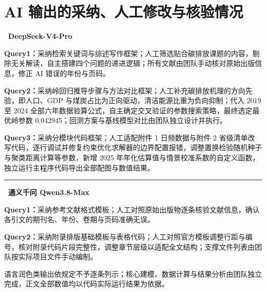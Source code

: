 \documentclass[12pt,a4paper]{ctexart}
\begin{document}
\section{AI 输出的采纳、人工修改与核验情况}

\noindent\textbf{\textbullet~DeepSeek-V4-Pro}

\textbf{Query1：}采纳检索关键词与综述写作框架；人工筛选贴合碳排放课题的内容，剔除无关解读，自主搭建四个问题的递进逻辑；所有文献由团队手动核对原始出版信息，修正 AI 错误的年份与页码。

\textbf{Query2：}采纳岭回归推导步骤与方法对比框架；人工补充碳排放机理的方向先验，即人口、GDP 与煤炭占比为正向驱动，清洁能源比重为负向抑制；代入 2019 至 2024 全部六年数据验算公式，自主确定交叉验证的参数搜索策略，最终选定最优岭参数 0.042945；回测方案与基线模型对比由团队独立设计并执行。

\textbf{Query3：}采纳分模块代码框架；人工适配附件 1 日频数据与附件 2 省级清单改写代码，逐行调试并修复约束优化求解器的边界配置报错，调整置换检验随机种子与聚类距离计算等参数，新增 2025 年年化估算值与情景校准系数的自定义函数，独立运行主程序代码导出全部配图与数值结果。

\noindent\rule{\linewidth}{0.4pt}

\noindent\textbf{\textbullet~通义千问 Qwen3.8-Max}

\textbf{Query1：}采纳参考文献格式模板；人工对照原始出版物逐条核验文献信息，确认各引文的期刊名、年份、卷期与页码准确无误。

\textbf{Query2：}采纳附录排版基础模板与表格代码；人工对照官方模板调整行距与编号，核对附录代码片段完整性，调整章节层级以适配全文结构；支撑文件列表由团队按实际项目文件手动编制。

\vspace{1em}
\noindent 语言润色类输出依规定不予逐条列示；核心建模、数据计算与结果分析由团队独立完成，正文全部数值均以代码实际运行结果为依据。
\end{document}
